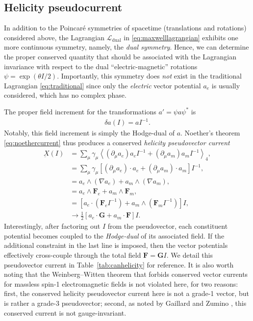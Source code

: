 \documentclass[1p,sort&compress]{elsarticle}
\numberwithin{equation}{section}
\newcommand{\bv}[1]{\mathbf{#1}}
\newcommand{\smean}[1]{\left\langle #1 \right\rangle}
\begin{document}

\subsection{Helicity pseudocurrent}\label{sec:helicity}


In addition to the Poincar\'{e} symmetries of spacetime (translations and rotations) considered above, the Lagrangian $\mathcal{L}_{\text{dual}}$ in \eqref{eq:maxwelllagrangian} exhibits one more continuous symmetry, namely, the \emph{dual symmetry}. Hence, we can determine the proper conserved quantity that should be associated with the Lagrangian invariance with respect to the dual ``electric-magnetic'' rotations $\psi = \exp(\theta I/2)$. Importantly, this symmetry does \emph{not} exist in the traditional Lagrangian \eqref{eq:traditional} since only the \emph{electric} vector potential $a_e$ is usually considered, which has no complex phase.

The proper field increment for the transformations $a' = \psi a \psi^*$ is 
\begin{align}
  \delta a(I) = a I^{-1}.
\end{align}
Notably, this field increment is simply the Hodge-dual of $a$. Noether's theorem \eqref{eq:noethercurrent} thus produces a conserved \emph{helicity pseudovector current} 
\begin{align}
  \underbar{X}(I) &= \sum_\mu\gamma_\mu\smean{(\partial_\mu a_e)a_eI^{-1} + (\partial_\mu a_m)a_mI^{-1}}_4, \\
  &= \sum_\mu\gamma_\mu[(\partial_\mu a_e)\cdot a_e + (\partial_\mu a_m)\cdot a_m]I^{-1}, \nonumber \\
  &= a_e\wedge(\nabla a_e) + a_m\wedge(\nabla a_m), \nonumber \\
  &= a_e\wedge\bv{F}_e + a_m\wedge\bv{F}_m, \nonumber \\
  &= [a_e\cdot(\bv{F}_eI^{-1}) + a_m \wedge(\bv{F}_m I^{-1})]I, \nonumber \\
  &\to \frac{1}{2}[a_e\cdot \bv{G} + a_m\cdot \bv{F}]I. \nonumber
\end{align}
Interestingly, after factoring out $I$ from the pseudovector, each constituent potential becomes coupled to the \emph{Hodge-dual} of its associated field.  If the additional constraint in the last line is imposed, then the vector potentials effectively cross-couple through the total field $\bv{F} = \bv{G} I$.  We detail this pseudovector current in Table~\ref{tab:canhelicity} for reference.  It is also worth noting that the Weinberg--Witten theorem \cite{Weinberg1980,Stepanovsky1998,Smith2007} that forbids conserved vector currents for massless spin-1 electromagnetic fields is not violated here, for two reasons: first, the conserved helicity pseudovector current here is not a grade-1 vector, but is rather a grade-3 pseudovector; second, as noted by Gaillard and Zumino \cite{Gaillard1981}, this conserved current is not gauge-invariant.
\end{document}
